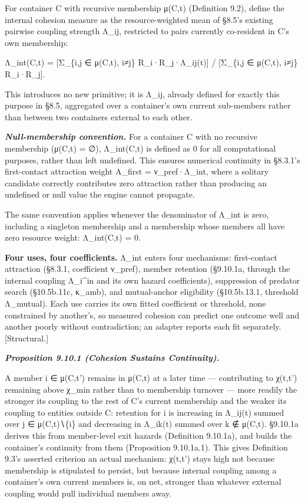 \documentclass[
]{article}
\begin{document}
For container C with recursive membership μ(C,t) (Definition 9.2),
define the internal cohesion measure as the resource-weighted mean of
§8.5's existing pairwise coupling strength Λ\_ij, restricted to pairs
currently co-resident in C's own membership:

Λ\_int(C,t) = {[}Σ\_\{i,j ∈ μ(C,t), i≠j\} R\_i·R\_j·Λ\_ij(t){]} /
{[}Σ\_\{i,j ∈ μ(C,t), i≠j\} R\_i·R\_j{]}.

This introduces no new primitive; it is Λ\_ij, already defined for
exactly this purpose in §8.5, aggregated over a container's own current
sub-members rather than between two containers external to each other.

\emph{\textbf{Null-membership convention.}} For a container C with no
recursive membership (μ(C,t) = ∅), Λ\_int(C,t) is defined as 0 for all
computational purposes, rather than left undefined. This ensures
numerical continuity in §8.3.1's first-contact attraction weight
A\_first = ν\_pref·Λ\_int, where a solitary candidate correctly
contributes zero attraction rather than producing an undefined or null
value the engine cannot propagate.

The same convention applies whenever the denominator of Λ\_int is zero,
including a singleton membership and a membership whose members all have
zero resource weight: Λ\_int(C,t) = 0.

\textbf{Four uses, four coefficients.} Λ\_int enters four mechanisms:
first-contact attraction (§8.3.1, coefficient ν\_pref), member retention
(§9.10.1a, through the internal coupling Λ\_i\^{}in and its own hazard
coefficients), suppression of predator search (§10.5b.11c, κ\_amb), and
mutual-anchor eligibility (§10.5b.13.1, threshold Λ\_mutual). Each use
carries its own fitted coefficient or threshold, none constrained by
another's, so measured cohesion can predict one outcome well and another
poorly without contradiction; an adapter reports each fit separately.
{[}Structural.{]}

\emph{\textbf{Proposition 9.10.1 (Cohesion Sustains Continuity).}}

A member i ∈ μ(C,t') remains in μ(C,t) at a later time --- contributing
to χ(t,t') remaining above χ\_min rather than to membership turnover ---
more readily the stronger its coupling to the rest of C's current
membership and the weaker its coupling to entities outside C: retention
for i is increasing in Λ\_ij(t) summed over j ∈ μ(C,t)∖\{i\} and
decreasing in Λ\_ik(t) summed over k ∉ μ(C,t). §9.10.1a derives this
from member-level exit hazards (Definition 9.10.1a), and builds the
container's continuity from them (Proposition 9.10.1a.1). This gives
Definition 9.3's asserted criterion an actual mechanism: χ(t,t') stays
high not because membership is stipulated to persist, but because
internal coupling among a container's own current members is, on net,
stronger than whatever external coupling would pull individual members
away.
\end{document}
